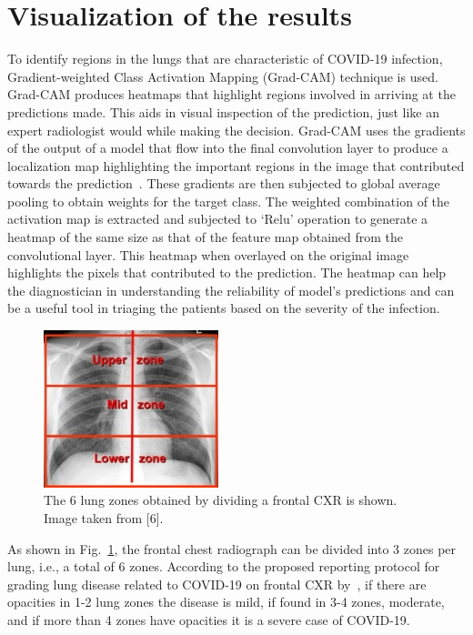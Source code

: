 \documentclass[10pt,journal,compsoc]{IEEEtran}
\begin{document}
\section{Visualization of the results}
To identify regions in the lungs that are characteristic of COVID-19 infection, Gradient-weighted Class Activation Mapping (Grad-CAM) technique is used. Grad-CAM produces heatmaps that highlight regions involved in arriving at the predictions made. This aids in visual inspection of the prediction, just like an expert radiologist would while making the decision. Grad-CAM uses the gradients of the output of a model that flow into the final convolution layer to produce a localization map highlighting the important regions in the image that contributed towards the prediction~\cite{selvaraju2017grad}. These gradients are then subjected to global average pooling to obtain weights for the target class. The weighted combination of the activation map is extracted and subjected to ‘Relu’ operation to generate a heatmap of the same size as that of the feature map obtained from the convolutional layer. This heatmap when overlayed on the original image highlights the pixels that contributed to the prediction. The heatmap can help the diagnostician in understanding the reliability of model’s predictions and can be a useful tool in triaging the patients based on the severity of the infection. 

\begin{figure}[!t]
\centering
\includegraphics[width=2.0in]{Picture2.jpg}
\caption{The 6 lung zones obtained by dividing a frontal CXR is shown. Image taken from [6].}
\label{fig_4}
\end{figure}

As shown in Fig.~\ref{fig_4}, the frontal chest radiograph can be divided into 3 zones per lung, i.e., a total of 6 zones. According to the proposed reporting protocol for grading lung disease related to COVID-19 on frontal CXR by~\cite{litmanovich2020review}, if there are opacities in 1-2 lung zones the disease is mild, if found in 3-4 zones, moderate, and if more than 4 zones have opacities it is a severe case of COVID-19.
\end{document}
